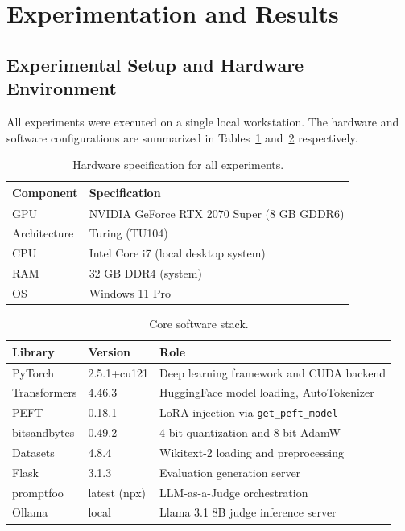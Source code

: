\documentclass[11pt, a4paper]{article}
\begin{document}
\section{Experimentation and Results}
\label{sec:results}

\subsection{Experimental Setup and Hardware Environment}
\label{subsec:setup}

All experiments were executed on a single local workstation. The hardware and software configurations are summarized in Tables~\ref{tab:hardware} and~\ref{tab:software} respectively.

\begin{table}[H]
\centering
\caption{Hardware specification for all experiments.}
\label{tab:hardware}
\begin{tabular}{@{}ll@{}}
\toprule
\textbf{Component}    & \textbf{Specification} \\ \midrule
GPU           & NVIDIA GeForce RTX 2070 Super (8 GB GDDR6) \\
Architecture  & Turing (TU104) \\
CPU           & Intel Core i7 (local desktop system) \\
RAM           & 32 GB DDR4 (system) \\
OS            & Windows 11 Pro \\ \bottomrule
\end{tabular}
\end{table}

\begin{table}[H]
\centering
\caption{Core software stack.}
\label{tab:software}
\begin{tabular}{@{}lll@{}}
\toprule
\textbf{Library}   & \textbf{Version}      & \textbf{Role} \\ \midrule
PyTorch            & 2.5.1+cu121           & Deep learning framework and CUDA backend \\
Transformers       & 4.46.3                & HuggingFace model loading, AutoTokenizer \\
PEFT               & 0.18.1                & LoRA injection via \texttt{get\_peft\_model} \\
bitsandbytes       & 0.49.2                & 4-bit quantization and 8-bit AdamW \\
Datasets           & 4.8.4                 & Wikitext-2 loading and preprocessing \\
Flask              & 3.1.3                 & Evaluation generation server \\
promptfoo          & latest (npx)          & LLM-as-a-Judge orchestration \\
Ollama             & local                 & Llama 3.1 8B judge inference server \\ \bottomrule
\end{tabular}
\end{table}
\end{document}
